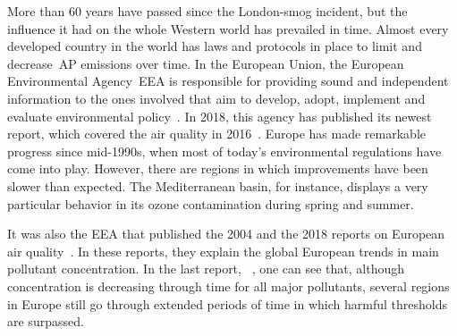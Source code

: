 More than 60 years have passed since the London-smog incident, but the
influence it had on the whole Western world has prevailed in time.
Almost every developed country in the world has laws and protocols in
place to limit and decrease~\gls{AP} emissions over time. In the
European Union, the European Environmental Agency~\gls{EEA} is
responsible for providing sound and independent information to the ones
involved that aim to develop, adopt, implement and evaluate
environmental policy~\cite{EEA2019}. In 2018, this agency has published
its newest report, which covered the air quality in 2016~\cite{EEA2016}.
Europe has made remarkable progress since mid-1990s, when most of
today's environmental regulations have come into play. However, there
are regions in which improvements have been slower than expected. The
Mediterranean basin, for instance, displays a very particular behavior
in its ozone contamination during spring and summer.


It was also the \gls{EEA} that published the 2004
and the 2018 reports on European air quality~\cite{EEA2007, EEA2016}. In
these reports, they explain the global European trends in main pollutant
concentration. In the last report, ~\cite{EEA2016}, one can see that,
although concentration is decreasing through time for all major
pollutants, several regions in Europe still go through extended periods
of time in which harmful thresholds are surpassed.





